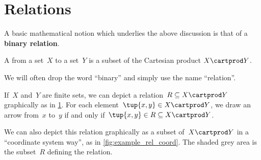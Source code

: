 

\section{Relations}
\label{sec:connection-relations}

A basic mathematical notion which underlies the above discussion is that of a \textbf{binary relation}.

\begin{definition}
  \label{def:binary-relation}
  A \emph{} from a set~$X$ to a set~$Y$ is a subset of the Cartesian product $X\cartprod Y$.
\end{definition}

\begin{remark}
  We will often drop the word ``binary'' and simply use the name ``relation''.
\end{remark}


If~$X$ and~$Y$ are finite sets, we can depict a relation~$R \subseteq X \cartprod Y$ graphically as in \cref{fig:example_rel}. For each element~$\tup{x,y} \in X \cartprod Y$, we draw an arrow from~$x$ to~$y$ if and only if~$\tup{x,y} \in R \subseteq X \cartprod Y$.

\begin{figure}[h!]
  \centering
  \caption{}
  \label{fig:example_rel}
\end{figure}

We can also depict this relation graphically as a subset of~$X \cartprod Y$ in a ``coordinate system way'', as in \cref{fig:example_rel_coord}. The shaded grey area is the subset~$R$ defining the relation.
%

